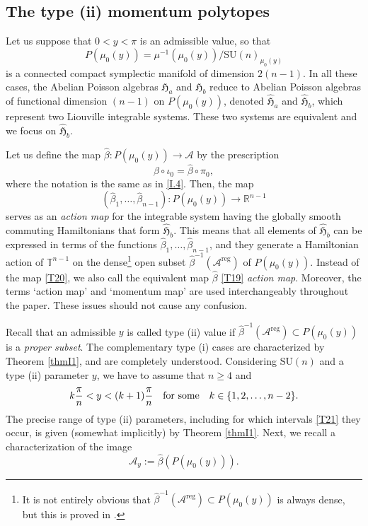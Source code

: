 \documentclass[a4paper,11pt,reqno]{amsart}
\theoremstyle{definition}
\numberwithin{equation}{section}
\newcommand{\be}{\begin{equation}}
\newcommand{\ee}{\end{equation}}
\def\cA{{\mathcal A}}                       %
\def\bT{{\mathbb T}}                        %
\def\reg{\mathrm{reg}}                      %
\def\bR{{\mathbb R}}                        %
\def\SU{\mathrm{SU}}                        %
\def\fH{{\mathfrak{H}}}                     %
\def\reg{\mathrm{reg}}                      %
\begin{document}
 \subsection{The type (ii) momentum polytopes}\label{Sec23}

 Let us suppose that $0<y < \pi$ is an admissible value, so that
 \be
 P(\mu_0(y)) = \mu^{-1}(\mu_0(y))/ \SU(n)_{\mu_0(y)}
 \label{T18}\ee
 is a connected compact symplectic manifold of dimension $2(n-1)$.
 In all these cases, the Abelian Poisson algebras $\fH_a$ and $\fH_b$ reduce to Abelian
 Poisson algebras of functional dimension $(n-1)$ on $P(\mu_0(y))$, denoted $\hat \fH_a$ and $\hat \fH_b$,
 which represent two  Liouville integrable systems.
 These two systems are equivalent and we focus on $\hat \fH_b$.

 Let us define the map $\hat \beta: P(\mu_0(y)) \to \cA$ by the prescription
 \be
 \beta \circ \iota_0 = \hat \beta \circ \pi_0,
 \label{T19}\ee
 where the notation is the same as in \eqref{I.4}.
 Then, the map
 \be
 (\hat \beta_1, \dots, \hat \beta_{n-1}): P(\mu_0(y)) \to \bR^{n-1}
 \label{T20}\ee
serves as an \emph{action map} for the integrable system
 having the globally smooth commuting Hamiltonians that form $\hat \fH_b$.
This means that all elements of $\hat \fH_b$ can be expressed in terms of the
functions $\hat \beta_1,\dots, \hat \beta_{n-1}$,  and they generate a Hamiltonian action of $\bT^{n-1}$ on
the dense\footnote{It is not entirely obvious that  $\hat \beta^{-1}(\cA^\reg) \subset P(\mu_0(y))$ is
always dense, but this is proved in \cite{FK}.}  open subset $\hat \beta^{-1}(\cA^\reg)$ of $P(\mu_0(y))$.
Instead of the map \eqref{T20}, we also call the equivalent map $\hat \beta$ \eqref{T19} \emph{action map}.
 Moreover, the terms `action map' and `momentum map' are used interchangeably throughout the paper.
These issues should not cause any confusion.


 Recall that an admissible $y$ is called type (ii) value if $\hat \beta^{-1}(\cA^\reg) \subset P(\mu_0(y))$  is a
 \emph{proper subset}.
 The complementary type (i) cases are characterized by Theorem \ref{thmI1}, and are completely understood.
 Considering $\SU(n)$ and a type (ii) parameter $y$, we have to assume that $n\geq 4$ and
 \be
 k \frac{\pi}{n} <  y < (k+1) \frac{\pi}{n}  \quad \hbox{for some} \quad k \in \{ 1, 2,\dots, n-2\}.
 \label{T21}\ee
 The precise range of type (ii) parameters, including for which intervals \eqref{T21}  they occur, is
 given (somewhat implicitly) by Theorem \ref{thmI1}.
Next, we recall  a characterization of the image
\be
\cA_y:= \hat \beta(P(\mu_0(y))).
\label{T22}\ee
\end{document}
